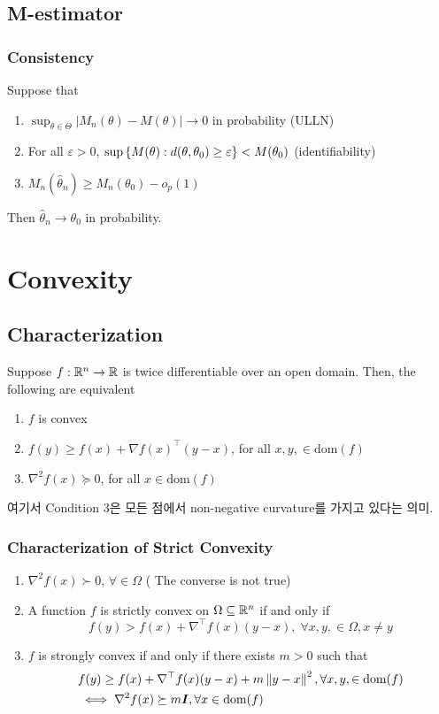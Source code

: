 \documentclass[10pt]{article}
\begin{document}
\subsection{M-estimator}
\subsubsection{Consistency}
 Suppose that 
\begin{enumerate}
    \item $\sup_{\theta \in \Theta} | M_n (\theta) - M(\theta)| \to 0$ in probability (ULLN)
    \item For all $\varepsilon >0$, $\sup \left\{ M(\theta): d(\theta, \theta_0) \geq \varepsilon \right\} < M (\theta_0)$ (identifiability)  
    \item $M_n (\hat{\theta}_n) \geq M_n (\theta_0) - o_p (1)$
\end{enumerate}
Then $\hat{\theta}_n \to \theta_0$ in probability. 
\section{Convexity}
\subsection{Characterization}
Suppose $f: \mathbb{R}^n \to \mathbb{R}$ is twice differentiable over an open domain. Then, the following are equivalent
\begin{enumerate}
    \item $f$ is convex 
    \item $f(y) \geq f(x) + \nabla f(x)^{\top} (y-x)$, for all $x,y, \in \text{dom}(f)$
    \item $\nabla^2 f(x) \succeq 0$, for all $x \in \text{dom}(f)$
\end{enumerate}
여기서 Condition $3$은 모든 점에서 non-negative curvature를 가지고 있다는 의미. 
\subsubsection{Characterization of Strict Convexity}
\begin{enumerate}
    \item $\nabla^2 f(x) \succ  0$, $\forall \in \Omega$ ( The converse is not true) 
    \item A function $f$ is strictly convex on $\Omega \subseteq \mathbb{R}^n$ if and only if 
    \begin{equation*}
        f(y) > f(x) + \nabla^{\top} f(x) (y-x), \; \forall x,y, \in \Omega, x \neq y 
    \end{equation*}
    \item $f$ is strongly convex if and only if there exists $m>0$ such that 
    \begin{align*}
        &f(y) \geq f(x) + \nabla^{\top} f(x) (y-x) + m \left\lVert y-x\right\rVert^2, \forall x,y, \in \text{dom}(f) \\ 
        &\iff  \nabla^2 f(x) \succeq m {\bm{I}}, \forall x \in \text{dom}(f)
    \end{align*}
\end{enumerate}
\end{document}
